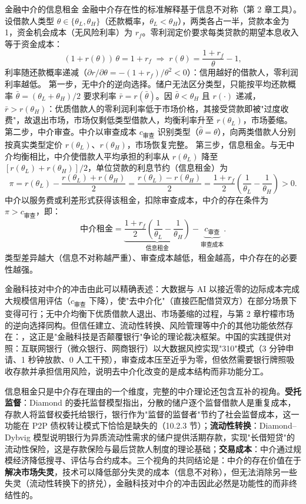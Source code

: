 \begin{derivation}{金融中介的信息租金}{}
金融中介存在性的标准解释基于信息不对称（第 2 章工具）。设借款人类型 $\theta \in \{\theta_L, \theta_H\}$（还款概率，$\theta_L < \theta_H$），两类各占一半，贷款本金为 1，资金机会成本（无风险利率）为 $r_f$。零利润定价要求每类贷款的期望本息收入等于资金成本：
\[
(1 + r(\theta))\,\theta = 1 + r_f \;\Rightarrow\; r(\theta) = \frac{1 + r_f}{\theta} - 1,
\]
利率随还款概率递减（$\partial r/\partial \theta = -(1+r_f)/\theta^2 < 0$）：信用越好的借款人，零利润利率越低。
第一步，无中介的逆向选择。储户无法区分类型，只能按平均还款概率 $\bar\theta = (\theta_L + \theta_H)/2$ 要求利率 $\bar r = r(\bar\theta)$。因 $\bar\theta < \theta_H$ 且 $r(\cdot)$ 递减，$\bar r > r(\theta_H)$：优质借款人的零利润利率低于市场价格，其接受贷款即被"过度收费"，故退出市场，市场仅剩低类型借款人，均衡利率升至 $r(\theta_L)$，市场萎缩。
第二步，中介审查。中介以审查成本 $c_{\text{审查}}$ 识别类型（$\hat\theta = \theta$），向两类借款人分别按真实类型定价 $r(\theta_L)$、$r(\theta_H)$，市场恢复完整。
第三步，信息租金。与无中介均衡相比，中介使借款人平均承担的利率从 $r(\theta_L)$ 降至 $[r(\theta_L) + r(\theta_H)]/2$，单位贷款的利息节约（信息租金）为
\[
\pi = r(\theta_L) - \frac{r(\theta_L) + r(\theta_H)}{2} = \frac{r(\theta_L) - r(\theta_H)}{2} = \frac{1 + r_f}{2}\left(\frac{1}{\theta_L} - \frac{1}{\theta_H}\right) > 0.
\]
中介以服务费或利差形式获得该租金，扣除审查成本，中介的存在条件为 $\pi > c_{\text{审查}}$，即：
\[
\text{中介租金} = \underbrace{\frac{1 + r_f}{2}\left(\frac{1}{\theta_L} - \frac{1}{\theta_H}\right)}_{\text{信息租金}} - \underbrace{c_{\text{审查}}}_{\text{审查成本}}.
\]
类型差异越大（信息不对称越严重）、审查成本越低，租金越高，中介存在的必要性越强。
\end{derivation}

金融科技对中介的冲击由此可以精确表述：大数据与 AI 以接近零的边际成本完成大规模信用评估（$c_{\text{审查}}$ 下降），使"去中介化"（直接匹配借贷双方）在部分场景下变得可行；无中介均衡下优质借款人退出、市场萎缩的过程，与第 2 章柠檬市场的逆向选择同构。但信任建立、流动性转换、风险管理等中介的其他功能依然存在：，这正是"金融科技是否颠覆银行"争论的理论裁决框架。中国的实践提供对照：互联网银行（微众银行、网商银行）以大数据风控实现"310"模式（3 分钟申请、1 秒钟放款、0 人工干预），审查成本压至近乎为零，但依然需要银行牌照吸收存款并承担信用风险，说明去中介化改变的是成本结构而非功能分工。

信息租金只是中介存在理由的一个维度，完整的中介理论还包含互补的视角。\textbf{受托监督}：Diamond 的委托监督模型指出，分散的储户逐个监督借款人是重复成本，存款人将监督权委托给银行，银行作为"监督的监督者"节约了社会监督成本，这一功能在 P2P 债权转让模式下恰恰是缺失的（10.2.3 节）；\textbf{流动性转换}：Diamond--Dybvig 模型说明银行为异质流动性需求的储户提供活期存款，实现"长借短贷"的流动性保险，这是存款保险与最后贷款人制度的理论基础；\textbf{交易成本}：中介通过规模经济降低搜寻、评估与合约成本。三个视角的共同结论是：中介的存在价值在于\textbf{解决市场失灵}，技术可以降低部分失灵的成本（信息不对称），但无法消除另一些失灵（流动性转换下的挤兑），金融科技对中介的冲击因此必然是功能性的而非终结性的。

